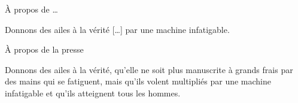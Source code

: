 \begin{frame}{À propos de \ldots}
\begin{coolquote}
Donnons des ailes à la vérité [\ldots] par une machine infatigable.
\end{coolquote}
\end{frame}
\begin{frame}{À propos de la presse}
\begin{coolquote}[Gutenberg, 1455]
Donnons des ailes à la vérité, qu'elle ne soit plus manuscrite à grands frais par des mains qui se fatiguent, mais qu'ils volent multipliés par une machine infatigable et qu'ils atteignent tous les hommes.
\end{coolquote}
\end{frame}

